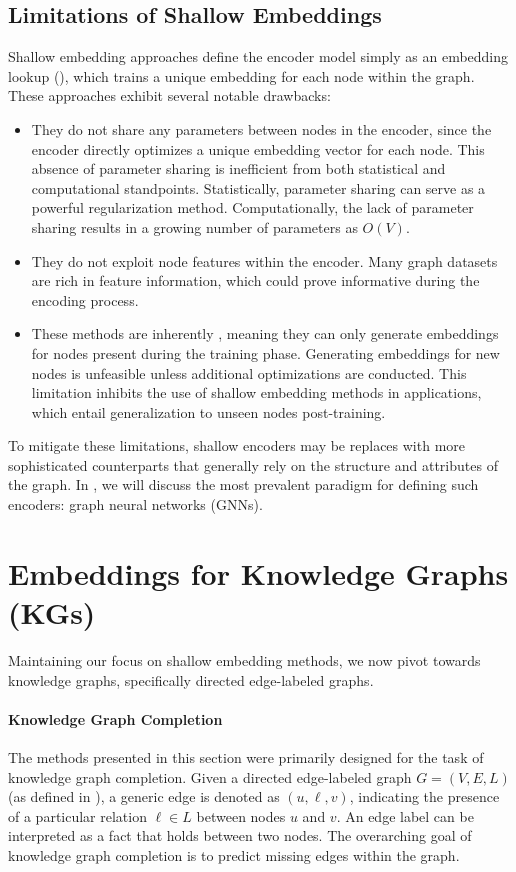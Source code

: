 \subsection{Limitations of Shallow Embeddings}
Shallow embedding approaches define the encoder model simply as an embedding lookup (), which trains a unique embedding for each node within the graph. These approaches exhibit several notable drawbacks:
\begin{itemize}
    \item They do not share any parameters between nodes in the encoder, since the encoder directly optimizes a unique embedding vector for each node. This absence of parameter sharing is inefficient from both statistical and computational standpoints. Statistically, parameter sharing can serve as a powerful regularization method. Computationally, the lack of parameter sharing results in a growing number of parameters as $ O(V) $.
    \item They do not exploit node features within the encoder. Many graph datasets are rich in feature information, which could prove informative during the encoding process.
    \item These methods are inherently , meaning they can only generate embeddings for nodes present during the training phase. Generating embeddings for new nodes is unfeasible unless additional optimizations are conducted. This limitation inhibits the use of shallow embedding methods in  applications, which entail generalization to unseen nodes post-training.
\end{itemize}
To mitigate these limitations, shallow encoders may be replaces with more sophisticated counterparts that generally rely on the structure and attributes of the graph. In , we will discuss the most prevalent paradigm for defining such encoders: graph neural networks (GNNs).

\section{Embeddings for Knowledge Graphs (KGs)}\label{sec:embeddingsKGs}
Maintaining our focus on shallow embedding methods, we now pivot towards knowledge graphs, specifically directed edge-labeled graphs.

\paragraph{Knowledge Graph Completion}
The methods presented in this section were primarily designed for the task of knowledge graph completion. Given a directed edge-labeled graph $ G = (V, E, L) $ (as defined in ), a generic edge is denoted as $ (u,\ell,v) $, indicating the presence of a particular relation $ \ell \in L $ between nodes $ u $ and $ v $. An edge label can be interpreted as a fact that holds between two nodes. The overarching goal of knowledge graph completion is to predict missing edges within the graph.

